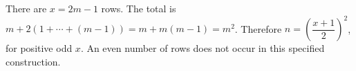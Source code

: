 There are $x=2m-1$ rows. The total is $m+2(1+\cdots+(m-1))=m+m(m-1)=m^2$. Therefore $\boxed{n=\left(\dfrac{x+1}{2}\right)^2}$, for positive odd $x$. An even number of rows does not occur in this specified construction.
